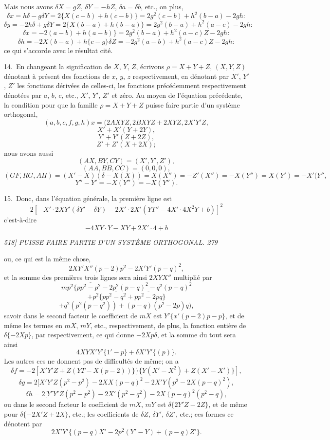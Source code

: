 \documentclass[11pt,a4paper]{book}
\begin{document}
\medskip

Mais nous avons $\delta X = gZ$, $\delta Y = -hZ$, $\delta a = \delta b$, etc., on plus,
\[
\delta x = h\delta - g\delta Y = 2\{X(c - b) + h(c - b)\} = 2g^2(c - b) + h^2(b - a) - 2gh:
\]
\[
\delta y = -2h\delta + g\delta Y = 2\{X(b - a) + h(b - a)\} = 2g^2(b - a) + h^2(a - c) - 2gh:
\]
\[
\delta x = -2(a - b) + h(a - b)\} = 2g^2(b - a) + h^2(a - c)Z - 2gh:
\]
\[
\delta h = -2X(b - a) + h\{c - g\} \delta Z = -2g^2(a - b) + h^2(a - c)Z - 2gh:
\]
ce qui s'accorde avec le r\'esultat cit\'e.

\medskip

14.~En changeant la signification de $X$, $Y$, $Z$, \'ecrivons $\rho = X + Y + Z$, $(X, Y, Z)$
d\'enotant \`a pr\'esent des fonctions de $x$, $y$, $z$ respectivement, en d\'enotant par $X'$, $Y'$, $Z'$
les fonctions d\'eriv\'ees de celles-ci, les fonctions pr\'ec\'edemment respectivement d\'enot\'ees par
$a$, $b$, $c$, etc., $X'$, $Y'$, $Z'$ et z\'ero. Au moyen de l'\'equation pr\'ec\'edente, la condition pour que
la famille $\rho = X + Y + Z$ puisse faire partie d'un syst\`eme orthogonal,
\[
(a, b, c, f, g, h)x = (2A X Y Z, 2BX YZ + 2X Y Z, 2X' Y'Z,
\]
\[
X' + X'(Y + 2Y),
\]
\[
Y' + Y'(Z + 2Z),
\]
\[
Z' + Z'(X + 2X);
\]
nous avons aussi
\[
(AX, BY, CY) = (X', Y', Z'),
\]
\[
(AA, BB, CC) = (0, 0, 0),
\]
\[
(GF, RG, AH) = (X' - X)(\delta - X(X)) = X(X'') = - Z'(X'') = - X(Y'') = X(Y') = -X'(Y'',
\]
\[
Y'' - Y' = -X(Y'') = -X(Y'').
\]

15.~Donc, dans l'\'equation g\'en\'erale, la premi\`ere ligne est
\[
2[- X' \cdot 2XY'(\delta Y' - \delta Y) - 2X' \cdot 2X'(YT'' - 4X' \cdot 4X^2 Y + b)]^2
\]
c'est-\`a-dire
\[
- 4 X Y \cdot Y - X Y + 2X' \cdot 4 + b
\]

\clearpage

\noindent\textit{518] \hfill PUISSE FAIRE PARTIE D'UN SYST\`EME ORTHOGONAL. \hfill 279}

\medskip

ou, ce qui est la m\^eme chose,
\[
2X Y' X''(p - 2)p^2 - 2X'Y'(p - q)^2,
\]
et la somme des premi\`eres trois lignes sera ainsi $2X Y X''$ multipli\'e par
\[
mp^2 \{p\overline{p^2 - p^2} - 2p^2(p - q)^2 - q^2(p - q)^2
\]
\[
+ p^2\{p\overline{p^2 - q^2} + p\overline{p^2 - 2p}q\}
\]
\[
+ q^2(p^2(p - q^2)) + (p - q)(p^2 - 2p)q),
\]
savoir dans le second facteur le coefficient de $mX$ est $Y'\{x'(p - 2)p - p\}$, et de m\^eme
les termes en $mX$, $mY$, etc., respectivement,
de plus, la fonction enti\`ere de $\delta\{- 2X p\}$, par respectivement, ce qui donne $-2X p \delta$,
et la somme du tout sera ainsi
\[
4X Y X' Y' \{1' - p\} + \delta X' Y' \{(p)\}.
\]
\medskip
Les autres ces ne donnent pas de difficult\'es de m\^eme; on a
\[
\delta f = -2[X'Y'Z + Z(YT - X(p - 2))\}\}\{Y(X' - X^2) + Z(X' - X')\}],
\]
\[
\delta g = 2[X'Y'Z(p^2 - p^2) - 2X X(p - q)^2 - 2X'Y(p^2 - 2X(p - q)^2),
\]
\[
\delta h = 2[Y'Y'Z(p^2 - p^2) - 2X'(p^2 - q^2) - 2X(p - q)^2(p^2 - q),
\]
ou dans le second facteur le coefficient de $mX$, $mY$ est $\delta\{2Y'Z - 2Z\}$, et de m\^eme pour
$\delta\{- 2X'Z + 2X\}$, etc.; les coefficients de $\delta Z$, $\delta Y'$, $\delta Z'$, etc.; ces formes ce d\'enotent par
\[
2X'Y'\{(p - q)X' - 2p^2(Y' - Y) + (p - q)Z'\}.
\]
\end{document}
